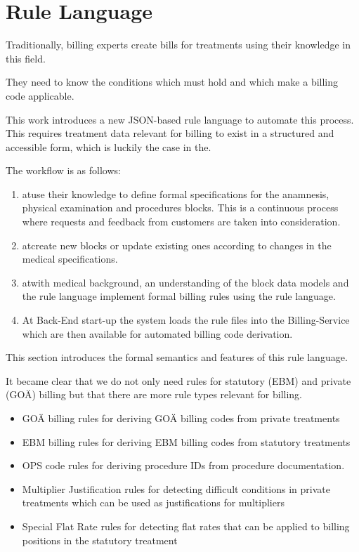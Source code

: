 \section{Rule Language}\label{sec:rule-language}

Traditionally, billing experts create bills for treatments using their knowledge in this field.

They need to know the conditions which must hold and which make a billing code applicable.

This work introduces a new JSON-based rule language to automate this process.
This requires treatment data relevant for billing to exist in a structured and accessible form,
which is luckily the case in the\AVS.

The workflow is as follows:
\begin{enumerate}
    \item \Me
    at\AV use their knowledge to define formal specifications for the anamnesis,
    physical examination and procedures blocks.
    This is a continuous process where requests and feedback from customers are taken into consideration.
    \item \Se at\AV create new blocks or update existing ones according to changes in the medical specifications.
    \item \Be at\AV with medical background,
    an understanding of the block data models and the rule language implement formal billing rules
    using the rule language.
    \item At Back-End start-up the system loads the rule files into the Billing-Service which are then available for automated billing code derivation.
\end{enumerate}


This section introduces the formal semantics and features of this rule language.

It became clear that we do not only need rules for statutory (EBM) and private
(GOÄ) billing but that there are more rule types relevant for billing.

\begin{itemize}
    \item GOÄ billing rules for deriving GOÄ billing codes from private treatments
    \item EBM billing rules for deriving EBM billing codes from statutory treatments
    \item OPS code rules for deriving procedure IDs from procedure documentation.
    \item Multiplier Justification rules for detecting difficult conditions in private treatments which can be used as justifications for multipliers
    \item Special Flat Rate rules for detecting flat rates that can be applied to billing positions in the statutory treatment
\end{itemize}


